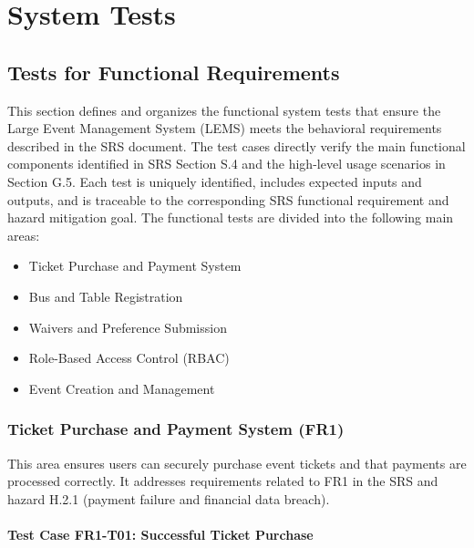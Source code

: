 \documentclass[12pt, titlepage]{article}
\begin{document}
\section{System Tests}

\subsection{Tests for Functional Requirements}

This section defines and organizes the functional system tests that ensure the Large Event Management System (LEMS) meets the behavioral requirements described in the SRS document. The test cases directly verify the main functional components identified in SRS Section S.4 and the high-level usage scenarios in Section G.5.  
Each test is uniquely identified, includes expected inputs and outputs, and is traceable to the corresponding SRS functional requirement and hazard mitigation goal.\newline \newline
The functional tests are divided into the following main areas:
\begin{itemize}
    \item Ticket Purchase and Payment System
    \item Bus and Table Registration
    \item Waivers and Preference Submission
    \item Role-Based Access Control (RBAC)
    \item Event Creation and Management
\end{itemize}

\subsubsection{Ticket Purchase and Payment System (FR1)}

This area ensures users can securely purchase event tickets and that payments are processed correctly. It addresses requirements related to FR1 in the SRS and hazard H.2.1 (payment failure and financial data breach).

\paragraph{Test Case FR1-T01: Successful Ticket Purchase}
\end{document}
